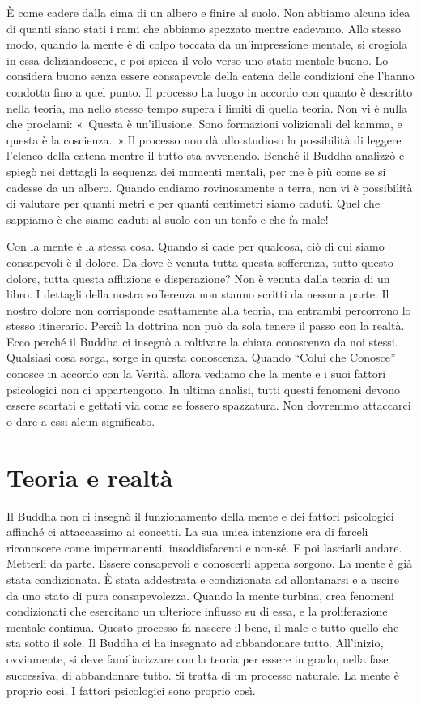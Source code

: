 È come cadere dalla cima di un albero e finire al suolo. Non abbiamo
alcuna idea di quanti siano stati i rami che abbiamo spezzato mentre
cadevamo. Allo stesso modo, quando la mente è di colpo toccata da
un'impressione mentale, si crogiola in essa deliziandosene, e poi spicca
il volo verso uno stato mentale buono. Lo considera buono senza essere
consapevole della catena delle condizioni che l'hanno condotta fino a
quel punto. Il processo ha luogo in accordo con quanto è descritto nella
teoria, ma nello stesso tempo supera i limiti di quella teoria. Non vi è
nulla che proclami: «~Questa è un'illusione. Sono formazioni volizionali
del kamma, e questa è la coscienza.~» Il processo non dà allo
studioso la possibilità di leggere l'elenco della catena mentre il tutto
sta avvenendo. Benché il Buddha analizzò e spiegò nei dettagli la
sequenza dei momenti mentali, per me è più come se si cadesse da un
albero. Quando cadiamo rovinosamente a terra, non vi è possibilità di
valutare per quanti metri e per quanti centimetri siamo caduti. Quel che
sappiamo è che siamo caduti al suolo con un tonfo e che fa male!

Con la mente è la stessa cosa. Quando si cade per qualcosa, ciò di cui
siamo consapevoli è il dolore. Da dove è venuta tutta questa sofferenza,
tutto questo dolore, tutta questa afflizione e disperazione? Non è
venuta dalla teoria di un libro. I dettagli della nostra sofferenza non
stanno scritti da nessuna parte. Il nostro dolore non corrisponde
esattamente alla teoria, ma entrambi percorrono lo stesso itinerario.
Perciò la dottrina non può da sola tenere il passo con la realtà. Ecco
perché il Buddha ci insegnò a coltivare la chiara conoscenza da noi
stessi. Qualsiasi cosa sorga, sorge in questa conoscenza. Quando ``Colui
che Conosce'' conosce in accordo con la Verità, allora vediamo che la
mente e i suoi fattori psicologici non ci appartengono. In ultima
analisi, tutti questi fenomeni devono essere scartati e gettati via come
se fossero spazzatura. Non dovremmo attaccarci o dare a essi alcun
significato.

\section{Teoria e realtà}

Il Buddha non ci insegnò il funzionamento della mente e dei fattori
psicologici affinché ci attaccassimo ai concetti. La sua unica
intenzione era di farceli riconoscere come impermanenti, insoddisfacenti
e non-sé. E poi lasciarli andare. Metterli da parte. Essere consapevoli
e conoscerli appena sorgono. La mente è già stata condizionata. È stata
addestrata e condizionata ad allontanarsi e a uscire da uno stato di
pura consapevolezza. Quando la mente turbina, crea fenomeni condizionati
che esercitano un ulteriore influsso su di essa, e la proliferazione
mentale continua. Questo processo fa nascere il bene, il male e tutto
quello che sta sotto il sole. Il Buddha ci ha insegnato ad abbandonare
tutto. All'inizio, ovviamente, si deve familiarizzare con la teoria per
essere in grado, nella fase successiva, di abbandonare tutto. Si tratta
di un processo naturale. La mente è proprio così. I fattori psicologici
sono proprio così.

